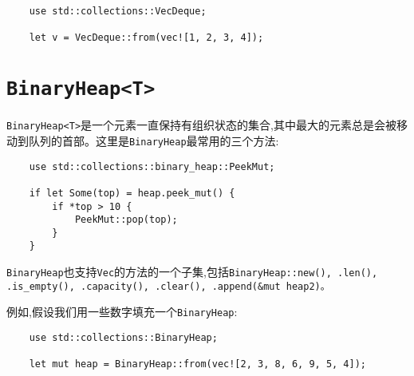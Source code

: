 
\begin{verbatim}
    use std::collections::VecDeque;

    let v = VecDeque::from(vec![1, 2, 3, 4]);
\end{verbatim}

\section{\texttt{BinaryHeap<T>}}

\texttt{BinaryHeap<T>}是一个元素一直保持有组织状态的集合,其中最大的元素总是会被移动到队列的首部。这里是\texttt{BinaryHeap}最常用的三个方法:




\begin{verbatim}
    use std::collections::binary_heap::PeekMut;

    if let Some(top) = heap.peek_mut() {
        if *top > 10 {
            PeekMut::pop(top);
        }
    }
\end{verbatim}

\texttt{BinaryHeap}也支持\texttt{Vec}的方法的一个子集,包括\texttt{BinaryHeap::new(), .len(), .is\_empty(), .capacity(), .clear(), .append(\&mut heap2)。}

例如,假设我们用一些数字填充一个\texttt{BinaryHeap}:
\begin{verbatim}
    use std::collections::BinaryHeap;

    let mut heap = BinaryHeap::from(vec![2, 3, 8, 6, 9, 5, 4]);
\end{verbatim}

